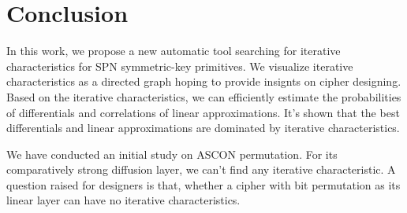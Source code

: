 \section{Conclusion\label{sec:conclusion}}

In this work, we propose a new automatic tool searching for iterative characteristics for SPN symmetric-key primitives. We visualize iterative characteristics as a directed graph hoping to provide insignts on cipher designing. Based on the iterative characteristics, we can efficiently estimate the probabilities of differentials and correlations of linear approximations. It's shown that the best differentials and linear approximations are dominated by iterative characteristics. 

We have conducted an initial study on ASCON permutation. For its comparatively strong diffusion layer, we can't find any iterative characteristic. A question raised for designers is that, whether a cipher with bit permutation as its linear layer can have no iterative characteristics.
